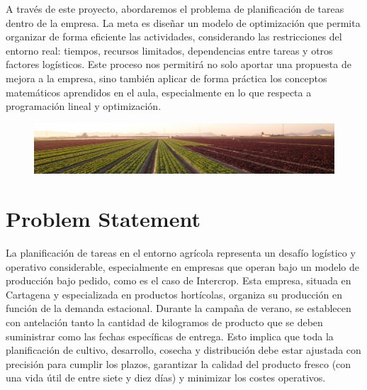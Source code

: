 A través de este proyecto, abordaremos el problema de planificación de tareas dentro de la empresa. La meta es diseñar un modelo de optimización que permita organizar de forma eficiente las actividades,
 considerando las restricciones del entorno real: tiempos, recursos limitados, dependencias entre tareas y otros factores logísticos.
Este proceso nos permitirá no solo aportar una propuesta de mejora a la empresa, sino también aplicar de forma práctica los conceptos matemáticos aprendidos en el aula, especialmente en lo que respecta a programación lineal y optimización.
\vspace{10mm}
\begin{figure}[ht!]
    \centering
    \includegraphics[width=1\textwidth]{img/campitos_lindos.jpeg}
    \label{fig:campitos_lindos}
\end{figure}

\chapter*{Problem Statement}

La planificación de tareas en el entorno agrícola representa un desafío logístico y operativo considerable,
especialmente en empresas que operan bajo un modelo de producción bajo pedido, como es el caso de Intercrop.
Esta empresa, situada en Cartagena y especializada en productos hortícolas, organiza su producción en función de la demanda estacional.
Durante la campaña de verano, se establecen con antelación tanto la cantidad de kilogramos de producto que se deben suministrar como las fechas específicas de entrega.
Esto implica que toda la planificación de cultivo, desarrollo, cosecha y distribución debe estar ajustada con precisión para cumplir los plazos,
garantizar la calidad del producto fresco (con una vida útil de entre siete y diez días) y minimizar los costes operativos.

